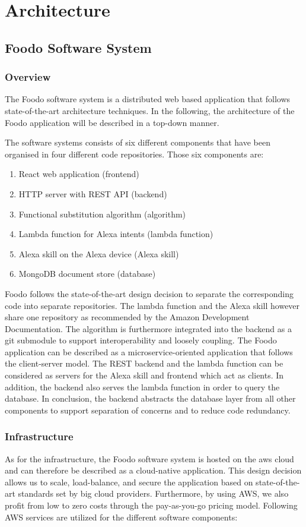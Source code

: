 \chapter{Architecture}
\section{Foodo Software System}
\subsection{Overview}
The Foodo software system is a distributed web based application that follows state-of-the-art architecture techniques. In the following, the architecture of the Foodo application will be described in a top-down manner.
 
The software systems consists of six different components that have been organised in four different code repositories. Those six components are:
\begin{enumerate}
	\itemsep-0.5em 
	\item React web application (frontend)
	\item HTTP server with REST API (backend)
	\item Functional substitution algorithm (algorithm)
	\item Lambda function for Alexa intents (lambda function)
	\item Alexa skill on the Alexa device (Alexa skill)
	\item MongoDB document store (database)
\end{enumerate}

Foodo follows the state-of-the-art design decision to separate the corresponding code into separate repositories. The lambda function and the Alexa skill however share one repository as recommended by the Amazon Development Documentation. The algorithm is furthermore integrated into the backend as a git submodule to support interoperability and loosely coupling. The Foodo application can be described as a microservice-oriented application that follows the client-server model. The REST backend and the lambda function can be considered as servers for the Alexa skill and frontend which act as clients. In addition, the backend also serves the lambda function in order to query the database. In conclusion, the backend abstracts the database layer from all other components to support separation of concerns and to reduce code redundancy. 

\subsection{Infrastructure}
As for the infrastructure, the Foodo software system is hosted on the \gls{aws} cloud and can therefore be described as a cloud-native application. This design decision allows us to scale, load-balance, and secure the application based on state-of-the-art standards set by big cloud providers. Furthermore, by using AWS, we also profit from low to zero costs through the pay-as-you-go pricing model. Following AWS services are utilized for the different software components:

